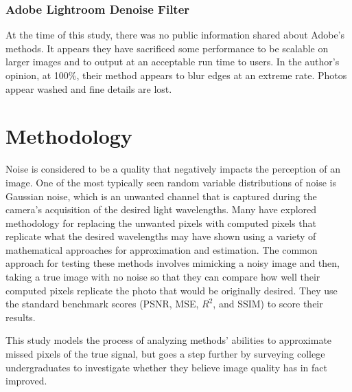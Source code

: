 \documentclass{ncjms}
\begin{document}
\subsubsection{Adobe Lightroom Denoise Filter}
At the time of this study, there was no public information shared about Adobe's methods. It appears they have sacrificed some performance to be scalable on larger images and to output at an acceptable run time to users. In the author's opinion, at 100\%, their method appears to blur edges at an extreme rate. Photos appear washed and fine details are lost. 

\section{Methodology}
Noise is considered to be a quality that negatively impacts the perception of an image. One of the most typically seen random variable distributions of noise is Gaussian noise, which is an unwanted channel that is captured during the camera's acquisition of the desired light wavelengths. Many have explored methodology for replacing the unwanted pixels with computed pixels that replicate what the desired wavelengths may have shown using a variety of mathematical approaches for approximation and estimation. The common approach for testing these methods involves mimicking a noisy image and then, taking a true image with no noise so that they can compare how well their computed pixels replicate the photo that would be originally desired. They use the standard benchmark scores (PSNR, MSE, $R^2$, and SSIM) to score their results. 

This study models the process of analyzing methods' abilities to approximate missed pixels of the true signal, but goes a step further by surveying college undergraduates to investigate whether they believe image quality has in fact improved.
\end{document}
